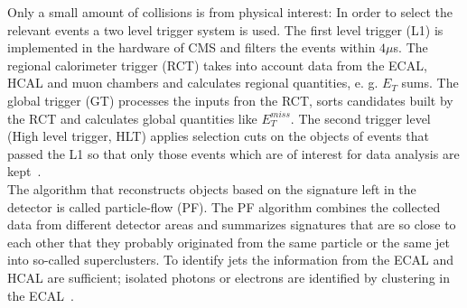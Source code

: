 Only a small amount of collisions is from physical interest: In order to select the relevant events a two level trigger system is used. The first level trigger (L1) is implemented in the hardware of CMS and filters the events
within $4 \mu$s. The regional calorimeter trigger (RCT) takes into account data from the ECAL, HCAL and muon chambers and calculates regional quantities, e. g. $E_T$ sums. The global trigger (GT) processes the inputs fron the RCT,
sorts candidates built by the RCT and calculates global quantities like $E_T^{miss}$. The second trigger level (High level trigger, HLT) applies selection cuts on the objects of events that passed the L1 so that only those events which
are of interest for data analysis are kept~\cite{CMS:2017trg}. \\

The algorithm that reconstructs objects based on the signature left in the detector is called particle-flow (PF). The PF algorithm combines the collected data from different detector areas and summarizes signatures that are so close to
each other that they probably originated from the same particle or the same jet into so-called superclusters. To identify jets the information from the ECAL and HCAL are sufficient; isolated photons or electrons are identified by clustering in the ECAL~\cite{CMS:2017pf}.










